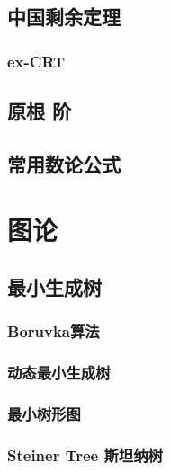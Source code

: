 \documentclass[a4paper, twoside]{article}
\begin{document}
\begin{multicols}{2}
			\subsection{中国剩余定理}
				

				\subsubsection{ex-CRT}
					
			
			
			\subsection{原根 阶}
				
			
			\subsection{常用数论公式}
				
				
		\newpage
		\section{图论}

			\subsection{最小生成树}
				\subsubsection{Boruvka算法}
					
				
				\subsubsection{动态最小生成树}
					
				
				\subsubsection{最小树形图}
					
				
				\subsubsection{Steiner Tree 斯坦纳树}
					
				

\end{multicols}
\end{document}

